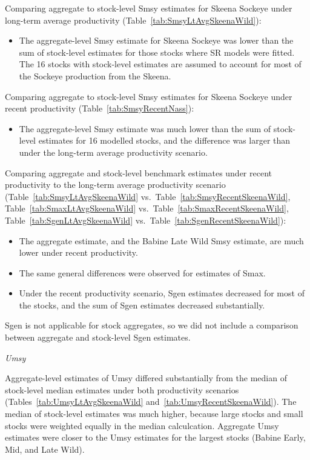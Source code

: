 \documentclass[french,11pt]{book}
\begin{document}
Comparing aggregate to stock-level Smsy estimates for Skeena Sockeye under long-term average productivity (Table~\ref{tab:SmsyLtAvgSkeenaWild}):
\begin{itemize}

\item
  The aggregate-level Smsy estimate for Skeena Sockeye was lower than the sum of stock-level estimates for those stocks where SR models were fitted. The 16 stocks with stock-level estimates are assumed to account for most of the Sockeye production from the Skeena.
\end{itemize}
Comparing aggregate to stock-level Smsy estimates for Skeena Sockeye under recent productivity (Table~\ref{tab:SmsyRecentNass}):
\begin{itemize}

\item
  The aggregate-level Smsy estimate was much lower than the sum of stock-level estimates for 16 modelled stocks, and the difference was larger than under the long-term average productivity scenario.
\end{itemize}
Comparing aggregate and stock-level benchmark estimates under recent productivity to the long-term average productivity scenario (Table~\ref{tab:SmsyLtAvgSkeenaWild} vs.~Table~\ref{tab:SmsyRecentSkeenaWild}, Table~\ref{tab:SmaxLtAvgSkeenaWild} vs.~Table~\ref{tab:SmaxRecentSkeenaWild}, Table~\ref{tab:SgenLtAvgSkeenaWild} vs.~Table~\ref{tab:SgenRecentSkeenaWild}):
\begin{itemize}

\item
  The aggregate estimate, and the Babine Late Wild Smsy estimate, are much lower under recent productivity.
\item
  The same general differences were observed for estimates of Smax.
\item
  Under the recent productivity scenario, Sgen estimates decreased for most of the stocks, and the sum of Sgen estimates decreased substantially.
\end{itemize}
Sgen is not applicable for stock aggregates, so we did not include a comparison between aggregate and stock-level Sgen estimates.

\emph{Umsy}

Aggregate-level estimates of Umsy differed substantially from the median of stock-level median estimates under both productivity scenarios (Tables~\ref{tab:UmsyLtAvgSkeenaWild} and~\ref{tab:UmsyRecentSkeenaWild}). The median of stock-level estimates was much higher, because large stocks and small stocks were weighted equally in the median calculcation. Aggregate Umsy estimates were closer to the Umsy estimates for the largest stocks (Babine Early, Mid, and Late Wild).
\end{document}
